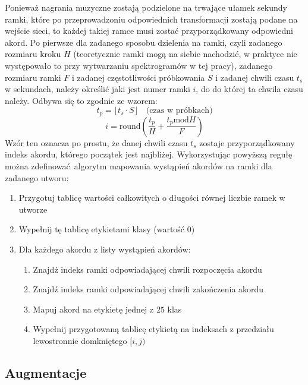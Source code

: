 Ponieważ nagrania muzyczne zostają podzielone na trwające ułamek sekundy ramki, które po
przeprowadzoniu odpowiednich transformacji zostają podane na wejście sieci, to każdej takiej ramce
musi zostać przyporządkowany odpowiedni akord. Po pierwsze dla zadanego sposobu dzielenia na ramki,
czyli zadanego rozmiaru kroku $H$ (teoretycznie ramki mogą na siebie nachodzić, w praktyce nie
występowało to przy wytwarzaniu spektrogramów w tej pracy), zadanego rozmiaru ramki $F$ i zadanej
częstotliwości próbkowania $S$ i zadanej chwili czasu $t_s$ w sekundach, należy określić jaki jest
numer ramki $i$, do do której ta chwila czasu należy. Odbywa się to zgodnie ze wzorem:
\begin{equation}
    t_p = \lfloor t_s \cdot S \rfloor \quad \textrm{(czas w próbkach)}
\end{equation}
\begin{equation}
    i = \textrm{round}(\frac{t_p}{H} + \frac{t_p \textrm{mod} H}{F})
\end{equation}
Wzór ten oznacza po prostu, że danej chwili czasu $t_s$ zostaje przyporządkowany indeks akordu,
którego początek jest najbliżej. Wykorzystując powyższą regułę można zdefinować algorytm mapowania
wystąpień akordów na ramki dla zadanego utworu:
\begin{enumerate}
    \item Przygotuj tablicę wartości całkowitych o długości równej liczbie ramek w utworze
    \item Wypełnij tę tablicę etykietami klasy  (wartość $0$)
    \item Dla każdego akordu z listy wystąpień akordów:
        \begin{enumerate}
            \item Znajdź indeks  ramki odpowiadającej chwili rozpoczęcia akordu
            \item Znajdź indeks  ramki odpowiadającej chwili zakończenia akordu
            \item Mapuj akord na etykietę  jednej z $25$ klas
            \item Wypełnij przygotowaną tablicę etykietą  na indeksach z przedziału
                lewostronnie domkniętego $[i,j)$
        \end{enumerate}
\end{enumerate}

\subsection{Augmentacje}

